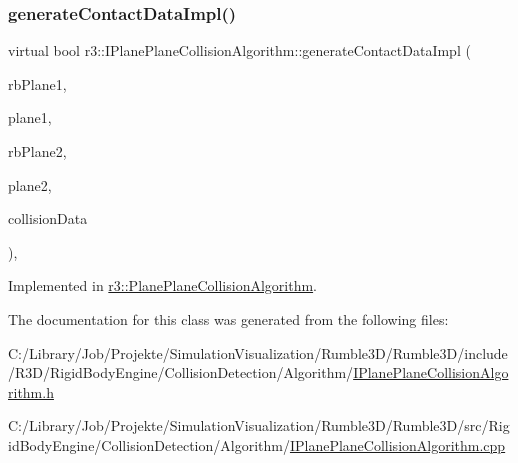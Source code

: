 \mbox{\label{classr3_1_1_i_plane_plane_collision_algorithm_a708dec70f58b4476976dfea9921d1524}} 
\subsubsection{\texorpdfstring{generate\+Contact\+Data\+Impl()}{generateContactDataImpl()}}
{\footnotesize\ttfamily virtual bool r3\+::\+I\+Plane\+Plane\+Collision\+Algorithm\+::generate\+Contact\+Data\+Impl (\begin{DoxyParamCaption}\item[{\mbox{\hyperlink{classr3_1_1_rigid_body}{Rigid\+Body}} $\ast$}]{rb\+Plane1,  }\item[{\mbox{\hyperlink{classr3_1_1_collision_plane}{Collision\+Plane}} $\ast$}]{plane1,  }\item[{\mbox{\hyperlink{classr3_1_1_rigid_body}{Rigid\+Body}} $\ast$}]{rb\+Plane2,  }\item[{\mbox{\hyperlink{classr3_1_1_collision_plane}{Collision\+Plane}} $\ast$}]{plane2,  }\item[{\mbox{\hyperlink{classr3_1_1_collision_data}{Collision\+Data}} \&}]{collision\+Data }\end{DoxyParamCaption})\hspace{0.3cm}{\ttfamily [protected]}, {}}



Implemented in \mbox{\hyperlink{classr3_1_1_plane_plane_collision_algorithm_a33400ba57a8c0550ada0778bb92eeb69}{r3\+::\+Plane\+Plane\+Collision\+Algorithm}}.



The documentation for this class was generated from the following files\+:\begin{DoxyCompactItemize}
\item 
C\+:/\+Library/\+Job/\+Projekte/\+Simulation\+Visualization/\+Rumble3\+D/\+Rumble3\+D/include/\+R3\+D/\+Rigid\+Body\+Engine/\+Collision\+Detection/\+Algorithm/\mbox{\hyperlink{_i_plane_plane_collision_algorithm_8h}{I\+Plane\+Plane\+Collision\+Algorithm.\+h}}\item 
C\+:/\+Library/\+Job/\+Projekte/\+Simulation\+Visualization/\+Rumble3\+D/\+Rumble3\+D/src/\+Rigid\+Body\+Engine/\+Collision\+Detection/\+Algorithm/\mbox{\hyperlink{_i_plane_plane_collision_algorithm_8cpp}{I\+Plane\+Plane\+Collision\+Algorithm.\+cpp}}\end{DoxyCompactItemize}
